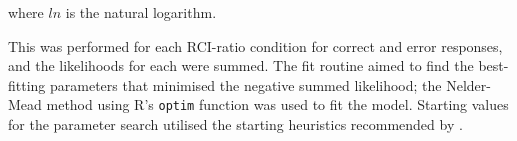 \documentclass[a4paper, man, natbib]{apa6}
\begin{document}
\noindent where $ln$ is the natural logarithm.

This was performed for each RCI-ratio condition for correct and error responses, and the likelihoods for each were summed. The fit routine aimed to find the best-fitting parameters that minimised the negative summed likelihood; the Nelder-Mead method using R's \texttt{optim} function was used to fit the model. Starting values for the parameter search utilised the starting heuristics recommended by  \cite{Donkin2011}.





\end{document}
